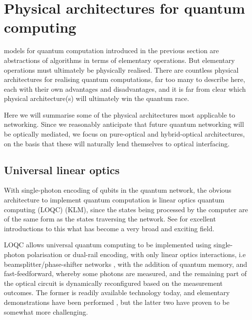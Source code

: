 %
%

\section{Physical architectures for quantum computing} \label{sec:archs_QC} 

 models for quantum computation introduced in the previous section are abstractions of algorithms in terms of elementary operations. But elementary operations must ultimately be physically realised. There are countless physical architectures for realising quantum computations, far too many to describe here, each with their own advantages and disadvantages, and it is far from clear which physical architecture(s) will ultimately win the quantum race.

Here we will summarise some of the physical architectures most applicable to networking. Since we reasonably anticipate that future quantum networking will be optically mediated, we focus on pure-optical and hybrid-optical architectures, on the basis that these will naturally lend themselves to optical interfacing.

%
%

\subsection{Universal linear optics} \label{sec:KLM_univ} 

With single-photon encoding of qubits in the quantum network, the obvious architecture to implement quantum computation is linear optics quantum computing (LOQC) \cite{bib:KLM01} (KLM), since the states being processed by the computer are of the same form as the states traversing the network. See \cite{bib:Kok05, bib:KokLovettBook} for excellent introductions to this what has become a very broad and exciting field.

LOQC allows universal quantum computing to be implemented using single-photon polarisation or dual-rail encoding, with only linear optics interactions, i.e beamsplitter/phase-shifter networks \cite{bib:Reck94}, with the addition of quantum memory, and fast-feedforward, whereby some photons are measured, and the remaining part of the optical circuit is dynamically reconfigured based on the measurement outcomes. The former is readily available technology today, and elementary demonstrations have been performed \cite{bib:OBrien03, bib:carolan2015universal}, but the latter two have proven to be somewhat more challenging.


